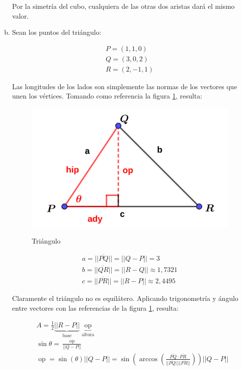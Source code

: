 \documentclass{article}
\begin{document}
\begin{enumerate}[(a)]
Por la simetría del cubo, cualquiera de las otras dos aristas dará el mismo valor.

\item Sean los puntos del triángulo:

\begin{subequations}
\begin{align}
P = (1, 1, 0) \\
Q = (3, 0, 2) \\
R = (2, -1, 1)
\end{align}
\end{subequations}

Las longitudes de los lados son simplemente las normas de los vectores que unen los vértices. Tomando como referencia la figura \ref{fig:1-8-e}, resulta:

\begin{figure}[ht]
\caption{Triángulo}
\includegraphics[scale=0.8]{img/ejercicios/1/8-e.png} 
\centering
\label{fig:1-8-e}
\end{figure}

\begin{subequations}
\begin{align}
a = ||\overline{PQ}|| = ||Q-P|| = 3 \\
b = ||\overline{QR}|| = ||R-Q|| \approx 1,7321 \\
c = ||\overline{PR}|| = ||R-P|| \approx 2,4495
\end{align}
\end{subequations}

Claramente el triángulo no es equilátero. Aplicando trigonometría y ángulo entre vectores con las referencias de la figura \ref{fig:1-8-e}, resulta:

\begin{subequations}
\begin{align}
& A = \frac{1}{2} \underbrace{||R-P||}_{\text{base}} \underbrace{ \mathop{op} }_{\text{altura}} \\
& \sin \theta = \frac{\mathop{op}}{||Q-P||} \\
& \mathop{op} = \sin (\theta) ||Q-P|| = \sin( \arccos \left( \frac{\overline{PQ} \cdot \overline{PR} }{||\overline{PQ}|| ||\overline{PR}||} \right) ) ||Q-P||
\end{align}
\end{subequations}


\end{enumerate}
\end{document}
